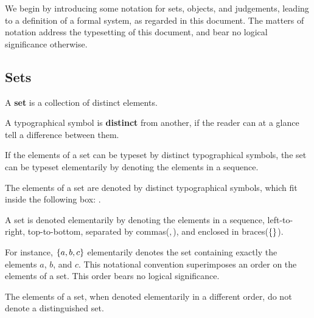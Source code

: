 We begin by introducing some notation for sets, objects, and judgements,
leading to a definition of a formal system, as regarded in this document. The
matters of notation address the typesetting of this document, and bear no
logical significance otherwise.

\subsection{Sets}

\begin{definition}

A \textbf{set} is a collection of distinct elements.

\end{definition}

\begin{notation}

A typographical symbol is \textbf{distinct} from another, if the reader
can at a glance tell a difference between them.

\end{notation}

If the elements of a set can be typeset by distinct typographical symbols, the
set can be typeset elementarily by denoting the elements in a sequence. 

\begin{notation}

The elements of a set are denoted by distinct typographical symbols, which fit
inside the following box: .

\end{notation}

\begin{notation}

A set is denoted elementarily by denoting the elements in a sequence,
left-to-right, top-to-bottom, separated by commas($,$), and enclosed in
braces($\left\{{}\right\}$).

\end{notation}

For instance, $\left\{{a,b,c}\right\}$ elementarily denotes the set containing exactly the
elements $a$, $b$, and $c$. This notational convention superimposes an order on
the elements of a set. This order bears no logical significance.

\begin{notational-corollary}

The elements of a set, when denoted elementarily in a different order, do not
denote a distinguished set.

\end{notational-corollary}

